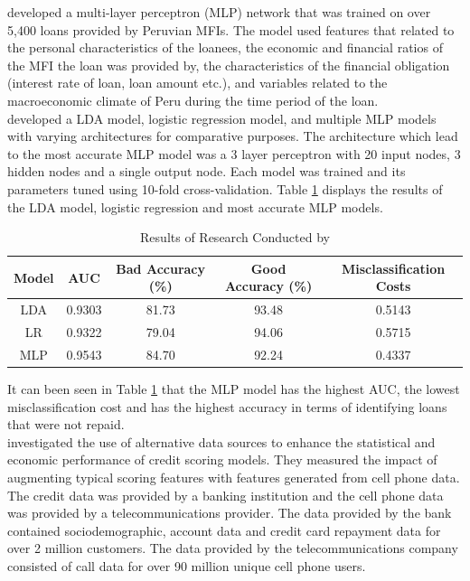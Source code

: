 \textcite{MFIMLP} developed a multi-layer perceptron (MLP) network that was trained on over 5,400 loans provided by Peruvian MFIs. The model used features that related to the personal characteristics of the loanees, the economic and financial ratios of the MFI the loan was provided by, the characteristics of the financial obligation (interest rate of loan, loan amount etc.), and variables related to the macroeconomic climate of Peru during the time period of the loan. \\

\textcite{MFIMLP} developed a LDA model, logistic regression model, and multiple MLP models with varying architectures for comparative purposes. The architecture which lead to the most accurate MLP model was a 3 layer perceptron with 20 input nodes, 3 hidden nodes and a single output node. Each model was trained and its parameters tuned using 10-fold cross-validation. Table \ref{table:MFIMLP} displays the results of the LDA model, logistic regression and most accurate MLP models. 

\vspace{10pt}

\begin{table}[H]
\begin{center}
\begin{tabular}{|c|c|c|c|c|} 
\hline
\multicolumn{1}{|c}{Model}  &\multicolumn{1}{|c|}{AUC}  &\multicolumn{1}{|c|}{Bad Accuracy (\%)} & \multicolumn{1}{c|}{Good Accuracy (\%)} & \multicolumn{1}{c|}{Misclassification Costs}\\
\hline
LDA  & 0.9303 &  81.73 & 93.48 & 0.5143 \\
\hline
LR & 0.9322 & 79.04 & 94.06  & 0.5715 \\
\hline
MLP & 0.9543 & 84.70 & 92.24 & 0.4337 \\
\hline
\end{tabular}
\end{center}
\caption{Results of Research Conducted by \textcite{MFIMLP}}
\label{table:MFIMLP}
\end{table}

\vspace{10pt}

It can been seen in Table \ref{table:MFIMLP} that the MLP model has the highest AUC, the lowest misclassification cost and has the highest accuracy in terms of identifying loans that were not repaid. \\

\textcite{BigDataMicroFiance} investigated the use of alternative
data sources to enhance the statistical and economic  performance of credit scoring models. They measured the impact of augmenting typical scoring features with features generated from cell phone data. The credit data was provided by a banking institution and the cell phone data was provided by a telecommunications provider. The data provided by the bank contained sociodemographic, account data and credit card repayment data for over 2 million customers. The data provided by the telecommunications company consisted of call data for over 90 million unique cell phone users. \\

